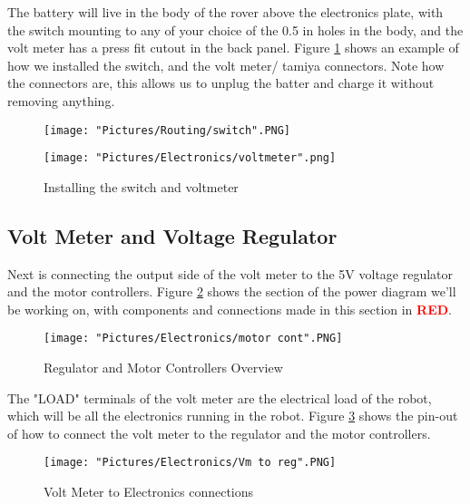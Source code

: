 \documentclass[12pt]{article}
\begin{document}
The battery will live in the body of the rover above the electronics plate, with the switch mounting to any of your choice of the 0.5 in holes in the body, and the volt meter has a press fit cutout in the back panel. Figure \ref{vms} shows an example of how we installed the switch, and the volt meter/ tamiya connectors. Note how the connectors are, this allows us to unplug the batter and charge it without removing anything. 


\begin{figure}[H]
 	\centering
  	\begin{minipage}[b]{0.40\textwidth}
		\texttt{[image: "Pictures/Routing/switch".PNG]}
  	\end{minipage}
  	\hfill
  	\begin{minipage}[b]{0.50\textwidth}
    		\texttt{[image: "Pictures/Electronics/voltmeter".png]}
  	\end{minipage}
	\caption{Installing the switch and voltmeter}
	\label{vms}
\end{figure}



\subsection{Volt Meter and Voltage Regulator}
Next is connecting the output side of the volt meter to the 5V voltage regulator and the motor controllers. Figure \ref{motor cont} shows the section of the power diagram we'll be working on, with components and connections made in this section in \textcolor{red}{\textbf{RED}}.

\begin{figure}[H]
  	\centering
    	\texttt{[image: "Pictures/Electronics/motor cont".PNG]}
 	\caption{Regulator and Motor Controllers Overview}
	\label{motor cont}
\end{figure}


The "LOAD" terminals of the volt meter are the electrical load of the robot, which will be all the electronics running in the robot. Figure \ref{vm sch} shows the pin-out of how to connect the volt meter to the regulator and the motor controllers.

\begin{figure}[H]
  	\centering
    	\texttt{[image: "Pictures/Electronics/Vm to reg".PNG]}
 	\caption{Volt Meter to Electronics connections}
	\label{vm sch}
\end{figure}
\end{document}
